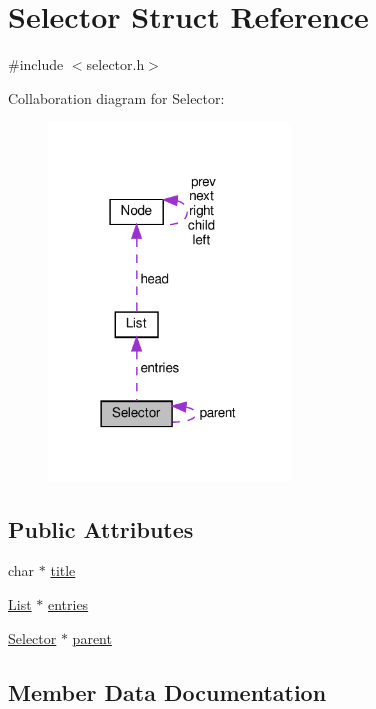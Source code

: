 \hypertarget{structSelector}{}\section{Selector Struct Reference}
\label{structSelector}


{\ttfamily \#include $<$selector.\+h$>$}



Collaboration diagram for Selector\+:
\nopagebreak
\begin{figure}[H]
\begin{center}
\leavevmode
\includegraphics[width=182pt]{structSelector__coll__graph}
\end{center}
\end{figure}
\subsection*{Public Attributes}
\begin{DoxyCompactItemize}
\item 
char $\ast$ \hyperlink{structSelector_acbfa3c726e4642bb73866e111c977580}{title}
\item 
\hyperlink{structList}{List} $\ast$ \hyperlink{structSelector_ad83f9e77b597630270e0fa403fcd25ca}{entries}
\item 
\hyperlink{structSelector}{Selector} $\ast$ \hyperlink{structSelector_a628decf5829be812d3817aa5c98ac0e3}{parent}
\end{DoxyCompactItemize}


\subsection{Member Data Documentation}
\mbox{\label{structSelector_ad83f9e77b597630270e0fa403fcd25ca}} 
